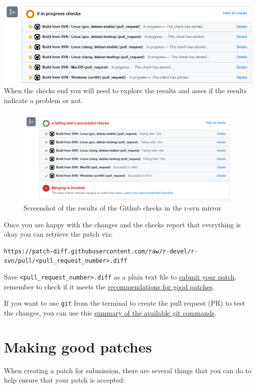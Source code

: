 \documentclass[
]{book}
\begin{document}
\includegraphics{img/rsvn_PR_automatic_checks.png}
When the checks end you will need to explore the results and asses if the results indicate a problem or not.

\begin{figure}
\centering
\includegraphics{img/rsvn_checks_results.png}
\caption{Screenshot of the results of the Github checks in the r-svn mirror}
\end{figure}

Once you are happy with the changes and the checks report that everything is okay you can retrieve the patch via:

\texttt{https://patch-diff.githubusercontent.com/raw/r-devel/r-svn/pull/\textless{}pull\_request\_number\textgreater{}.diff}

Save \texttt{\textless{}pull\_request\_number\textgreater{}.diff} as a plain text file to \hyperref[SubmitPatches]{submit your patch}, remember to check if it meets the \hyperref[GoodPatches]{recommendations for good patches}.

If you want to use \texttt{git} from the terminal to create the pull request (PR) to test the changes, you can use this \href{https://about.gitlab.com/images/press/git-cheat-sheet.pdf}{summary of the available git commands}.

\section{Making good patches}\label{GoodPatches}

When creating a patch for submission, there are several things that you can do to help ensure that your patch is accepted:
\end{document}
